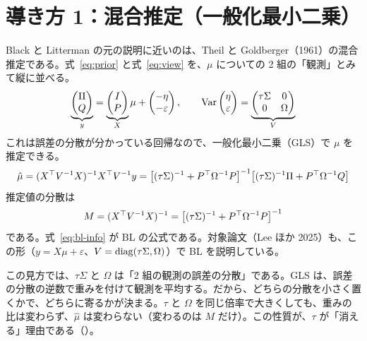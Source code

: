 \section{導き方 1：混合推定（一般化最小二乗）}

Black と Litterman の元の説明に近いのは、Theil と Goldberger（1961）の混合推定である。式~\eqref{eq:prior} と式~\eqref{eq:view} を、$\mu$ についての 2 組の「観測」とみて縦に並べる。
\begin{equation}
\underbrace{\begin{pmatrix}\Pi\\ Q\end{pmatrix}}_{y}
=\underbrace{\begin{pmatrix}I\\ P\end{pmatrix}}_{X}\mu
+\begin{pmatrix}-\eta\\ -\varepsilon\end{pmatrix},
\qquad
\mathrm{Var}\begin{pmatrix}\eta\\ \varepsilon\end{pmatrix}
=\underbrace{\begin{pmatrix}\tau\Sigma&0\\0&\Omega\end{pmatrix}}_{V}
\label{eq:gls-setup}
\end{equation}
これは誤差の分散が分かっている回帰なので、一般化最小二乗（GLS）で $\mu$ を推定できる。
\begin{equation}
\hat\mu=(X^{\top} V^{-1}X)^{-1}X^{\top} V^{-1}y
=\bigl[(\tau\Sigma)^{-1}+P^{\top}\Omega^{-1}P\bigr]^{-1}\bigl[(\tau\Sigma)^{-1}\Pi+P^{\top}\Omega^{-1}Q\bigr]
\label{eq:bl-info}
\end{equation}
推定値の分散は
\begin{equation}
M=(X^{\top} V^{-1}X)^{-1}=\bigl[(\tau\Sigma)^{-1}+P^{\top}\Omega^{-1}P\bigr]^{-1}
\label{eq:bl-M}
\end{equation}
である。式~\eqref{eq:bl-info} が BL の公式である。対象論文（Lee ほか 2025）も、この形（$y=X\mu+\varepsilon$、$V=\operatorname{diag}(\tau\Sigma,\Omega)$）で BL を説明している。

この見方では、$\tau\Sigma$ と $\Omega$ は「2 組の観測の誤差の分散」である。GLS は、誤差の分散の逆数で重みを付けて観測を平均する。だから、どちらの分散を小さく置くかで、どちらに寄るかが決まる。$\tau$ と $\Omega$ を同じ倍率で大きくしても、重みの比は変わらず、$\hat\mu$ は変わらない（変わるのは $M$ だけ）。この性質が、$\tau$ が「消える」理由である（）。

